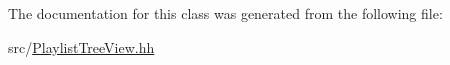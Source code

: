 \label{classPlaylistTreeView_1_1ModelColumns_ad4172e033be4ef6b2e47a8323601cee9}


\-The documentation for this class was generated from the following file\-:\begin{DoxyCompactItemize}
\item 
src/\hyperlink{PlaylistTreeView_8hh}{\-Playlist\-Tree\-View.\-hh}\end{DoxyCompactItemize}
